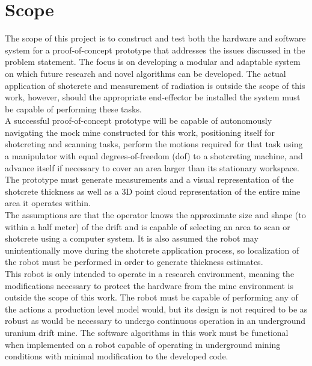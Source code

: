 \section{Scope}
\label{sec:scope}

The scope of this project is to construct and test both the hardware and software system for a proof-of-concept prototype that addresses the issues discussed in the problem statement. The focus is on developing a modular and adaptable system on which future research and novel algorithms can be developed. The actual application of shotcrete and measurement of radiation is outside the scope of this work, however, should the appropriate end-effector be installed the system must be capable of performing these tasks.\\

A successful proof-of-concept prototype will be capable of autonomously navigating the mock mine constructed for this work, positioning itself for shotcreting and scanning tasks, perform the motions required for that task using a manipulator with equal degrees-of-freedom (\acrshort{dof}) to a shotcreting machine, and advance itself if necessary to cover an area larger than its stationary workspace. The prototype must generate measurements and a visual representation of the shotcrete thickness as well as a 3D point cloud representation of the entire mine area it operates within.\\

The assumptions are that the operator knows the approximate size and shape (to within a half meter) of the drift and is capable of selecting an area to scan or shotcrete using a computer system. It is also assumed the robot may unintentionally move during the shotcrete application process, so localization of the robot must be performed in order to generate thickness estimates.\\

This robot is only intended to operate in a research environment, meaning the modifications necessary to protect the hardware from the mine environment is outside the scope of this work. The robot must be capable of performing any of the actions a production level model would, but its design is not required to be as robust as would be necessary to undergo continuous operation in an underground uranium drift mine. The software algorithms in this work must be functional when implemented on a robot capable of operating in underground mining conditions with minimal modification to the developed code.\\

